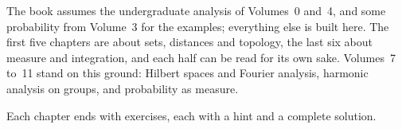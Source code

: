 The book assumes the undergraduate analysis of Volumes~0 and~4, and some probability from Volume~3 for the examples; everything else is built here. The first five chapters are about sets, distances and topology, the last six about measure and integration, and each half can be read for its own sake. Volumes~7 to~11 stand on this ground: Hilbert spaces and Fourier analysis, harmonic analysis on groups, and probability as measure.

Each chapter ends with exercises, each with a hint and a complete solution.
